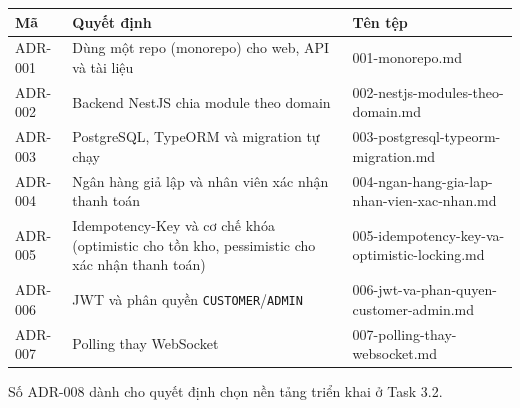 {\small\renewcommand{\arraystretch}{1.25}
\begin{tabularx}{\linewidth}{@{}l X X@{}}
\toprule
\textbf{Mã} & \textbf{Quyết định} & \textbf{Tên tệp} \\
\midrule
ADR-001 & Dùng một repo (monorepo) cho web, API và tài liệu & 001-monorepo.md \\
ADR-002 & Backend NestJS chia module theo domain & 002-nestjs-modules-theo-domain.md \\
ADR-003 & PostgreSQL, TypeORM và migration tự chạy & 003-postgresql-typeorm-migration.md \\
ADR-004 & Ngân hàng giả lập và nhân viên xác nhận thanh toán & 004-ngan-hang-gia-lap-nhan-vien-xac-nhan.md \\
ADR-005 & Idempotency-Key và cơ chế khóa (optimistic cho tồn kho, pessimistic cho xác nhận thanh toán) & 005-idempotency-key-va-optimistic-locking.md \\
ADR-006 & JWT và phân quyền \texttt{CUSTOMER}/\texttt{ADMIN} & 006-jwt-va-phan-quyen-customer-admin.md \\
ADR-007 & Polling thay WebSocket & 007-polling-thay-websocket.md \\
\bottomrule
\end{tabularx}}

Số ADR-008 dành cho quyết định chọn nền tảng triển khai ở Task 3.2.
